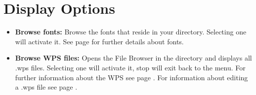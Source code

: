 \section{\label{ref:Displayoptions}Display Options}
  
  \begin{itemize}
  \item \textbf{Browse fonts:  }
    Browse the fonts that reside in your  directory. Selecting one will activate it. See page \pageref{ref:Loadingfonts} for further details about fonts.
    
  \item \textbf{Browse WPS files:  }
    Opens the File Browser in the  directory and displays all .wps files. Selecting one will activate it, stop will exit back to the menu.  For further information about the WPS see page \pageref{ref:WPS}. For information about editing a .wps file see page \pageref{ref:ConfiguringtheWPS}.
    

\end{itemize}
